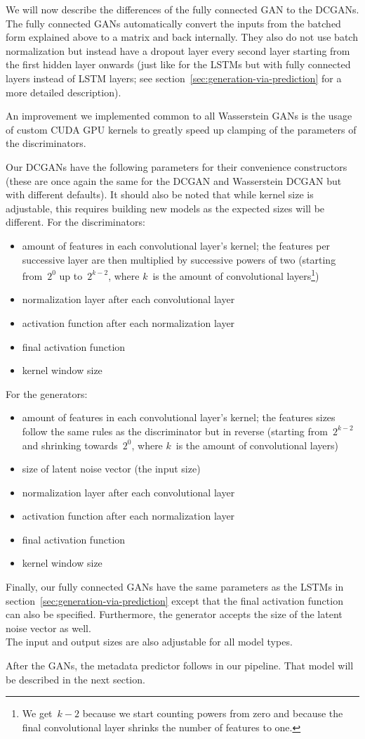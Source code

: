 We will now describe the differences of the fully connected GAN to the
DCGANs. The fully connected GANs automatically convert the inputs from
the batched form explained above to a matrix and back internally. They
also do not use batch normalization but instead have a dropout layer
every second layer starting from the first hidden layer onwards (just
like for the LSTMs but with fully connected layers instead of LSTM
layers; see section~\ref{sec:generation-via-prediction} for a more
detailed description).

An improvement we implemented common to all Wasserstein GANs is the
usage of custom CUDA GPU kernels to greatly speed up clamping of the
parameters of the discriminators.

Our DCGANs have the following parameters for their convenience
constructors (these are once again the same for the DCGAN and
Wasserstein DCGAN but with different defaults). It should also be
noted that while kernel size is adjustable, this requires building new
models as the expected sizes will be different. For the discriminators:
\begin{itemize}
\item amount of features in each convolutional layer's kernel; the
  features per successive layer are then multiplied by successive
  powers of two (starting from~$2^{0}$ up to~$2^{k - 2}$, where $k$~is
  the amount of convolutional layers\footnote{We get~$k - 2$ because
    we start counting powers from zero and because the final
    convolutional layer shrinks the number of features to one.})
\item normalization layer after each convolutional layer
\item activation function after each normalization layer
\item final activation function
\item kernel window size
\end{itemize}
For the generators:
\begin{itemize}
\item amount of features in each convolutional layer's kernel; the
  features sizes follow the same rules as the discriminator but in
  reverse (starting from~$2^{k - 2}$ and shrinking towards~$2^{0}$,
  where $k$~is the amount of convolutional layers)
\item size of latent noise vector (the input size)
\item normalization layer after each convolutional layer
\item activation function after each normalization layer
\item final activation function
\item kernel window size
\end{itemize}
Finally, our fully connected GANs have the same parameters as the
LSTMs in section~\ref{sec:generation-via-prediction} except that the
final activation function can also be specified. Furthermore, the
generator accepts the size of the latent noise vector as well. \\
The input and output sizes are also adjustable for all model types.

After the GANs, the metadata predictor follows in our pipeline. That
model will be described in the next section.



